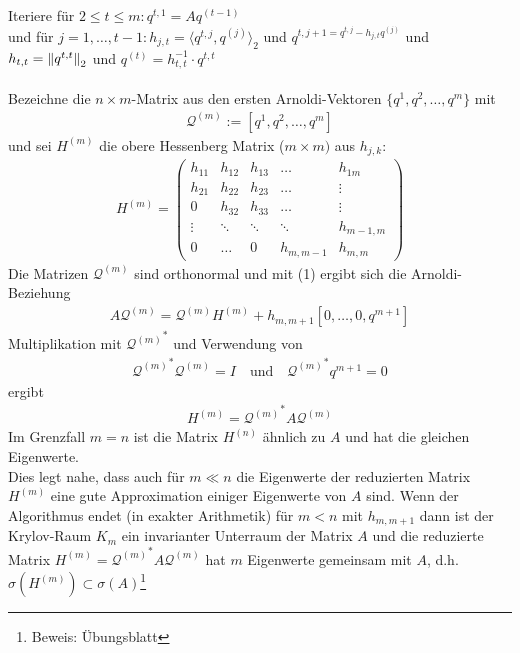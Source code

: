 Iteriere für $2\leq t\leq m: q^{t,1}=Aq^{(t-1)}$ \\
und für $j=1,\dots,t-1: h_{j,t} = \langle q^{t,j},q^{(j)}\rangle_2$ und $q^{t,j+1=q^{t,j}-h_{j,t}q^{(j)}}$ und $h_{t,t}=\vertn{2}{q^{t,t}}_2$ 
und $q^{(t)} = h_{t,t}^{-1}\cdot q^{t,t}$ \\ \\
Bezeichne die $n\times m$-Matrix aus den ersten Arnoldi-Vektoren $\{q^1,q^2,\dots,q^m\}$ mit 
\begin{align*}\mathcal{Q}^{(m)}:=[q^1,q^2,\dots,q^m]\end{align*} und sei $H^{(m)}$ die obere Hessenberg Matrix ($m\times m)$ aus $h_{j,k}$:
\begin{align*}H^{(m)} = \begin{pmatrix}
  h_{11} & h_{12} & h_{13} & \dots & h_{1m} \\
  h_{21} & h_{22} & h_{23} & \dots & \vdots \\
  0 & h_{32} & h_{33} & \dots & \vdots \\
  \vdots & \ddots &  \ddots &   \ddots &  h_{m-1,m} \\
  0 &\dots & 0 & h_{m,m-1} & h_{m,m}
\end{pmatrix}\end{align*}
Die Matrizen $\mathcal{Q}^{(m)}$ sind orthonormal und mit (1) ergibt sich die Arnoldi-Beziehung 
\begin{align*}A\mathcal{Q}^{(m)} = \mathcal{Q}^{(m)} H^{(m)} + h_{m,m+1}[0,\dots,0,q^{m+1}]\tag{3}\end{align*}
Multiplikation mit ${\mathcal{Q}^{(m)}}^*$  und Verwendung von 
\begin{align*}{\mathcal{Q}^{(m)}}^* \mathcal{Q}^{(m)} = I \quad \text{und}\quad {\mathcal{Q}^{(m)}}^* q^{m+1}=0\end{align*}
ergibt 
\begin{align*}H^{(m)} = {\mathcal{Q}^{(m)}}^* A \mathcal{Q}^{(m)}\end{align*}
Im Grenzfall $m=n$ ist die Matrix $H^{(n)}$ ähnlich zu $A$ und hat die gleichen Eigenwerte. \\
Dies legt nahe, dass auch für $m\ll n$ die Eigenwerte der reduzierten Matrix $H^{(m)}$ eine gute Approximation 
einiger Eigenwerte von $A$ sind. Wenn der Algorithmus endet (in exakter Arithmetik) für $m<n$ mit $h_{m,m+1}$ dann
ist der Krylov-Raum $K_m$ ein invarianter Unterraum der Matrix $A$ und die reduzierte Matrix $H^{(m)} = 
{\mathcal{Q}^{(m)}}^* A \mathcal{Q}^{(m)}$ hat $m$ Eigenwerte gemeinsam mit $A$, d.h. $\sigma(H^{(m)})\subset \sigma(A)$\footnote{Beweis: Übungsblatt}
